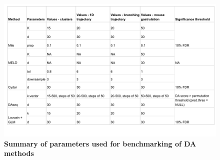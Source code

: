 \documentclass[
]{article}
\begin{document}
\begin{figure}
\centering
\includegraphics{suppl_tables/table_methods_params.pdf}
\caption{\label{fig:sup-tab-3}\textbf{Summary of parameters used for benchmarking of DA methods}}
\end{figure}



\newpage
\end{document}
